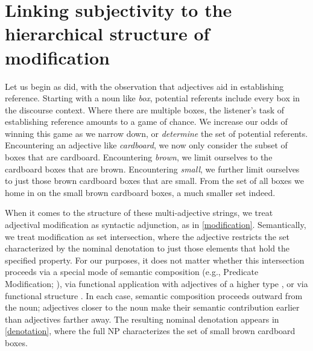 \documentclass{sp}
\begin{document}
%
%
%
%
%
%

\section{Linking subjectivity to the hierarchical structure of modification} \label{proposal}

Let us begin as \citeauthor{seiler1978} did, with the observation that adjectives aid in establishing reference. Starting with a noun like \emph{box}, potential referents include every box in the discourse context. Where there are multiple boxes, the listener's task of establishing reference amounts to a game of chance. We increase our odds of winning this game as we narrow down, or \emph{determine} the set of potential referents. Encountering an adjective like \emph{cardboard}, we now only consider the subset of boxes that are cardboard. Encountering \emph{brown}, we limit ourselves to the cardboard boxes that are brown. Encountering \emph{small}, we further limit ourselves to just those brown cardboard boxes that are small. From the set of all boxes we home in on the small brown cardboard boxes, a much smaller set indeed.

When it comes to the structure of these multi-adjective strings, we treat adjectival modification as syntactic adjunction, as in \ref{modification}. Semantically, we treat modification as set intersection, where the adjective restricts the set characterized by the nominal denotation to just those elements that hold the specified property. For our purposes, it does not matter whether this intersection proceeds via a special mode of semantic composition (e.g., Predicate Modification; \citealp{heimkratzer1998}), via functional application with adjectives of a higher type \citep[e.g.,][]{parsons1970modifiers},
or via functional structure \citep[e.g.,][]{scontrasnicolae2014}. In each case, semantic composition proceeds outward from the noun; adjectives closer to the noun make their semantic contribution earlier than adjectives farther away. The resulting nominal denotation appears in \ref{denotation}, where the full NP characterizes the set of small brown cardboard boxes.
\end{document}
